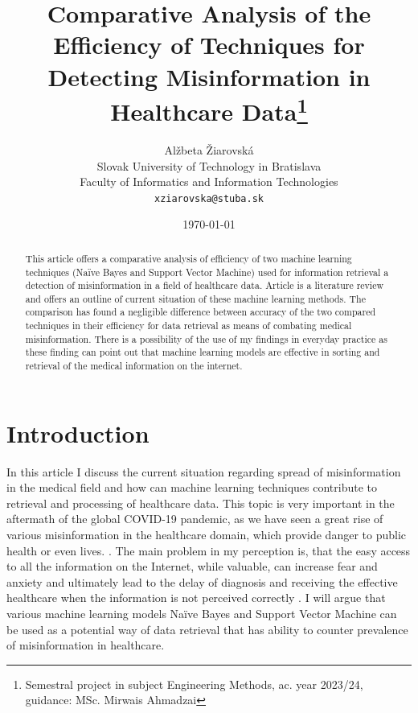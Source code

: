 \documentclass[11pt ,english,a4paper]{article}
\title{Comparative Analysis of the Efficiency of Techniques for Detecting Misinformation in Healthcare Data\thanks{Semestral project in subject Engineering Methods, ac. year 2023/24, guidance: MSc. Mirwais Ahmadzai}}
\author{Alžbeta Žiarovská\\[2pt]
	{\small Slovak University of Technology in Bratislava}\\
	{\small Faculty of Informatics and Information Technologies}\\
	{\small \texttt{xziarovska@stuba.sk}}
	}
\date{\small \today}
\begin{document}
\maketitle
\newpage

\begin{abstract}
This article offers a comparative analysis of efficiency of two machine learning techniques (Naïve Bayes and Support Vector Machine) used for information retrieval a detection of misinformation in a field of healthcare data. Article is a literature review and offers an outline of current situation of these machine learning methods. The comparison has found a negligible difference between accuracy of the two compared techniques in their efficiency for data retrieval as means of combating medical misinformation. There is a possibility of the use of my findings in everyday practice as these finding can point out that machine learning models are effective in sorting and retrieval of the medical information on the internet. 
\end{abstract}
\newpage

\section{Introduction}\label{intro}

In this article I discuss the current situation regarding spread of misinformation in the medical field and how can machine learning techniques contribute to retrieval and processing of healthcare data. This topic is very important in the aftermath of the global COVID-19 pandemic, as we have seen a great rise of various misinformation in the healthcare domain, which provide danger to public health or even lives. \cite{war18dr}. The main problem in my perception is, that the easy access to all the information on the Internet, while valuable, can increase fear and anxiety and ultimately lead to the delay of diagnosis and receiving the effective healthcare when the information is not perceived correctly \cite{wa19sys}. I will argue that various machine learning models Naïve Bayes and Support Vector Machine can be used as a potential way of data retrieval that has ability to counter prevalence of misinformation in healthcare.

\end{document}

